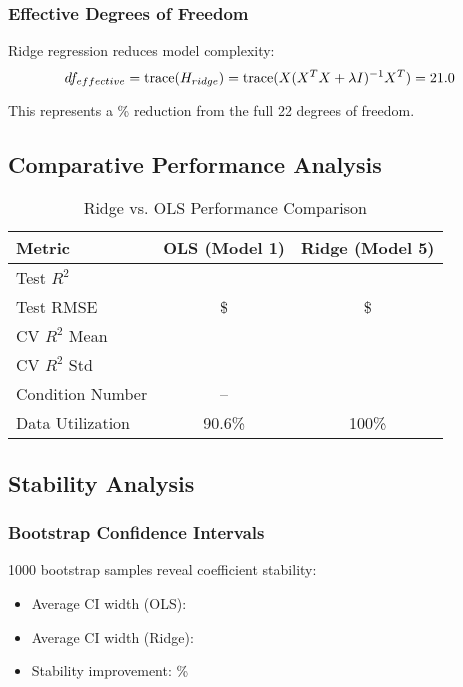\subsubsection{Effective Degrees of Freedom}

Ridge regression reduces model complexity:
\begin{equation}
df_{effective} = \text{trace}(H_{ridge}) = \text{trace}(X(X^TX + \lambda I)^{-1}X^T) = 21.0{}
\end{equation}

This represents a \ModelFiveDOFReduction{}\% reduction from the full 22 degrees of freedom.

\subsection{Comparative Performance Analysis}

\begin{table}[h]
\centering
\caption{Ridge vs. OLS Performance Comparison}
\begin{tabular}{lcc}
\toprule
\textbf{Metric} & \textbf{OLS (Model 1)} & \textbf{Ridge (Model 5)} \\
\midrule
Test $R^2$ & \ModelOneRSquaredTest{} & \ModelFiveRSquaredTest{} \\
Test RMSE & \$\ModelOneRMSETest{} & \$\ModelFiveRMSETest{} \\
CV $R^2$ Mean & \ModelOneCVMean{} & \ModelFiveCVMean{} \\
CV $R^2$ Std & \ModelOneCVStd{} & \ModelFiveCVStd{} \\
Condition Number & --%
                & \ModelFiveConditionNumber{} \\
Data Utilization & 90.6\% & 100\% \\
\bottomrule
\end{tabular}
\end{table}

\subsection{Stability Analysis}

\subsubsection{Bootstrap Confidence Intervals}

1000 bootstrap samples reveal coefficient stability:
\begin{itemize}
    \item Average CI width (OLS): \ModelFiveOLSCIWidth{}
    \item Average CI width (Ridge): \ModelFiveRidgeCIWidth{}
    \item Stability improvement: \ModelFiveStabilityImprovement{}\%
\end{itemize}

